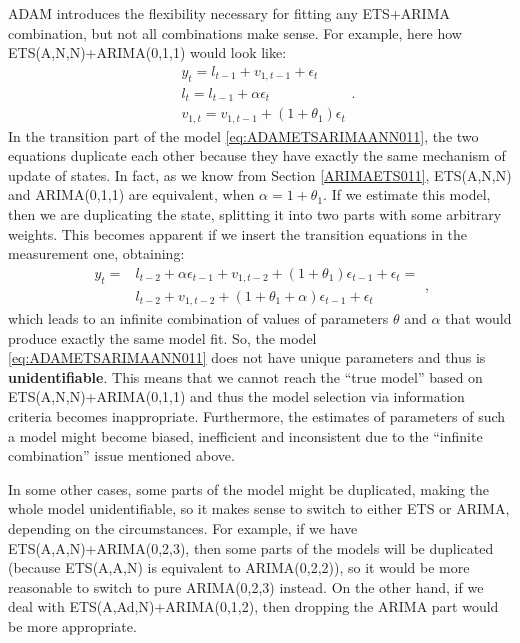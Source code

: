 \documentclass[
]{book}
\theoremstyle{definition}
\theoremstyle{definition}
\theoremstyle{definition}
\theoremstyle{definition}
\theoremstyle{remark}
\begin{document}
ADAM introduces the flexibility necessary for fitting any ETS+ARIMA combination, but not all combinations make sense. For example, here how ETS(A,N,N)+ARIMA(0,1,1) would look like:
\begin{equation}
  \begin{aligned}
    &{y}_{t} = l_{t-1} + v_{1,t-1} + \epsilon_t \\
    &l_t = l_{t-1} + \alpha \epsilon_t \\
    &v_{1,t} = v_{1,t-1} + (1+\theta_1) \epsilon_t
  \end{aligned}.
  \label{eq:ADAMETSARIMAANN011}
\end{equation}
In the transition part of the model \eqref{eq:ADAMETSARIMAANN011}, the two equations duplicate each other because they have exactly the same mechanism of update of states. In fact, as we know from Section \ref{ARIMAETS011}, ETS(A,N,N) and ARIMA(0,1,1) are equivalent, when \(\alpha=1+\theta_1\). If we estimate this model, then we are duplicating the state, splitting it into two parts with some arbitrary weights. This becomes apparent if we insert the transition equations in the measurement one, obtaining:
\begin{equation}
  \begin{aligned}
    {y}_{t} = & l_{t-2} + \alpha \epsilon_{t-1} + v_{1,t-2} + (1+\theta_1) \epsilon_{t-1} + \epsilon_t =\\
    & l_{t-2} + v_{1,t-2} + (1+\theta_1+\alpha) \epsilon_{t-1} + \epsilon_t
  \end{aligned},
  \label{eq:ADAMETSARIMAANN011Measurement}
\end{equation}
which leads to an infinite combination of values of parameters \(\theta\) and \(\alpha\) that would produce exactly the same model fit. So, the model \eqref{eq:ADAMETSARIMAANN011} does not have unique parameters and thus is \textbf{unidentifiable}. This means that we cannot reach the ``true model'' based on ETS(A,N,N)+ARIMA(0,1,1) and thus the model selection via information criteria becomes inappropriate. Furthermore, the estimates of parameters of such a model might become biased, inefficient and inconsistent due to the ``infinite combination'' issue mentioned above.

In some other cases, some parts of the model might be duplicated, making the whole model unidentifiable, so it makes sense to switch to either ETS or ARIMA, depending on the circumstances. For example, if we have ETS(A,A,N)+ARIMA(0,2,3), then some parts of the models will be duplicated (because ETS(A,A,N) is equivalent to ARIMA(0,2,2)), so it would be more reasonable to switch to pure ARIMA(0,2,3) instead. On the other hand, if we deal with ETS(A,Ad,N)+ARIMA(0,1,2), then dropping the ARIMA part would be more appropriate.
\end{document}
